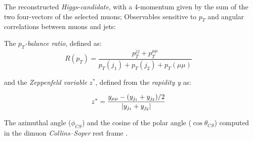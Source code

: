 \begin{outline}
\1 The reconstructed \emph{Higgs-candidate}, with a 4-momentum given by the sum of the two four-vectors of the selected muons;
\1 Observables sensitive to $p_T$ and angular correlations between muons and jets: 

The $p_T$\emph{-balance ratio}, defined as:
\[R(p_T) = \frac{p_T^{jj}+p_T^{\mu\mu}}{p_T(j_1) + p_T(j_2) + p_T(\mu\mu)}\]

and the \emph{Zeppenfeld variable} $z^*$, defined from the \emph{rapidity y} as:

\[z^* = \frac{y_{\mu\mu} - (y_{j_1} + y_{j_2})/2}{\abs{y_{j_1} + y_{j_2}}}\]

\1  The azimuthal angle ($\phi_{CS}$) and the cosine of the polar angle ($\cos\theta_{CS}$) computed in the dimuon \emph{Collins–Soper} rest frame \cite{PhysRevD.16.2219}.

\end{outline}
